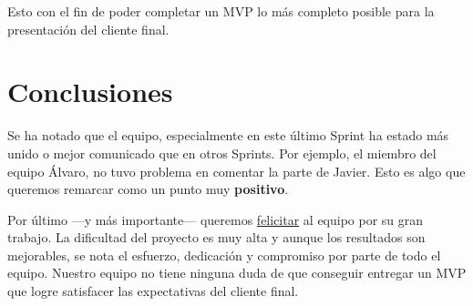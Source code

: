 \documentclass[12pt, a4paper, twoside]{article} %
\newcommand{\B}[1]{\textbf{#1}}
\newcommand{\ul}{\underline}
\begin{document}
Esto con el fin de poder completar un MVP lo más completo posible para la presentación del cliente final.

\section*{Conclusiones}

Se ha notado que el equipo, especialmente en este último Sprint ha estado más unido o mejor comunicado que en otros Sprints. Por ejemplo, el miembro del equipo Álvaro, no tuvo problema en comentar la parte de Javier. Esto es algo que queremos remarcar como un punto muy \B{\textcolor{verdeos}{positivo}}.

Por último ---y más importante--- queremos \ul{felicitar} al equipo por su gran trabajo. La dificultad del proyecto es muy alta y aunque los resultados son mejorables, se nota el esfuerzo, dedicación y compromiso por parte de todo el equipo. Nuestro equipo no tiene ninguna duda de que conseguir entregar un MVP que logre satisfacer las expectativas del cliente final.
\end{document}
